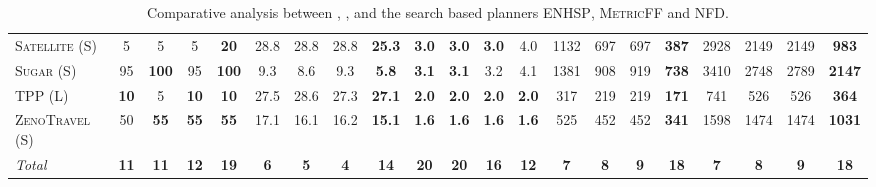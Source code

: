 \documentclass[11pt,landscape]{article}
\begin{document}
\begin{table*}[tb]
{\begin{tabular}{|l||cccc||cccc||cccc||cccc||cccc||}
\textsc{Satellite} (S)&5&5&5&\textbf{20}&28.8&28.8&28.8&\textbf{25.3}&\textbf{3.0}&\textbf{3.0}&\textbf{3.0}&4.0&1132&697&697&\textbf{387}&2928&2149&2149&\textbf{983}\\
\textsc{Sugar} (S)&95&\textbf{100}&95&\textbf{100}&9.3&8.6&9.3&\textbf{5.8}&\textbf{3.1}&\textbf{3.1}&3.2&4.1&1381&908&919&\textbf{738}&3410&2748&2789&\textbf{2147}\\
\textsc{TPP} (L)&\textbf{10}&5&\textbf{10}&\textbf{10}&27.5&28.6&27.3&\textbf{27.1}&\textbf{2.0}&\textbf{2.0}&\textbf{2.0}&\textbf{2.0}&317&219&219&\textbf{171}&741&526&526&\textbf{364}\\
\textsc{ZenoTravel} (S)&50&\textbf{55}&\textbf{55}&\textbf{55}&17.1&16.1&16.2&\textbf{15.1}&\textbf{1.6}&\textbf{1.6}&\textbf{1.6}&\textbf{1.6}&525&452&452&\textbf{341}&1598&1474&1474&\textbf{1031}
\\\hline
\textit{Total}&\textbf{11}&\textbf{11}&\textbf{12}&\textbf{19}&\textbf{6}&\textbf{5}&\textbf{4}&\textbf{14}&\textbf{20}&\textbf{20}&\textbf{16}&\textbf{12}&\textbf{7}&\textbf{8}&\textbf{9}&\textbf{18}&\textbf{7}&\textbf{8}&\textbf{9}&\textbf{18}\\\hline

        \end{tabular}}
        \caption{Comparative analysis between \pattyg, \pattyh, \pattyf and the search based planners \textsc{ENHSP}, \textsc{MetricFF} and \textsc{NFD}.}
        \label{tab:experiments}
        \end{table*}
        
\end{document}
